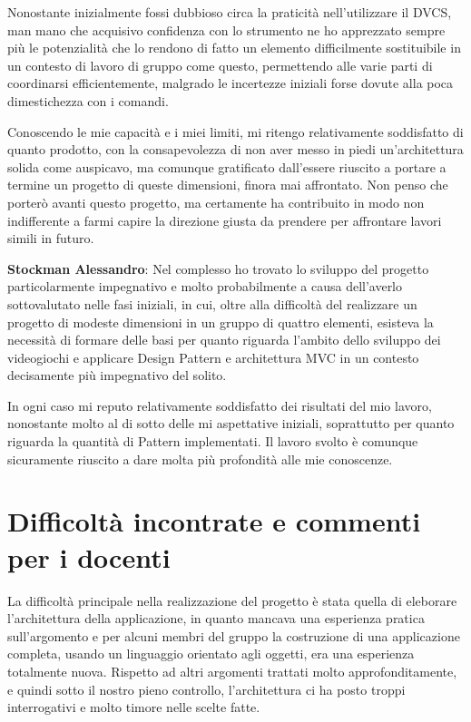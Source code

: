 \documentclass[a4paper,12pt, hidelinks]{report}
\begin{document}
Nonostante inizialmente fossi dubbioso circa la praticità nell'utilizzare il DVCS, man mano che acquisivo confidenza con lo strumento ne ho apprezzato sempre più le potenzialità che lo rendono di fatto un elemento difficilmente sostituibile in un contesto di lavoro di gruppo come questo, permettendo alle varie parti di coordinarsi efficientemente, malgrado le incertezze iniziali forse dovute alla poca dimestichezza con i comandi. 

Conoscendo le mie capacità e i miei limiti, mi ritengo relativamente soddisfatto di quanto prodotto, con la consapevolezza di non aver messo in piedi un'architettura solida come auspicavo, ma comunque gratificato dall'essere riuscito a portare a termine un progetto di queste dimensioni, finora mai affrontato. Non penso che porterò avanti questo progetto, ma certamente ha contribuito in modo non indifferente a farmi capire la direzione giusta da prendere per affrontare lavori simili in futuro.

	\item \textbf{Stockman Alessandro}: Nel complesso ho trovato lo sviluppo del progetto particolarmente impegnativo e molto probabilmente a causa dell'averlo sottovalutato nelle fasi iniziali, in cui, oltre alla difficoltà del realizzare un progetto di modeste dimensioni in un gruppo di quattro elementi, esisteva la necessità di formare delle basi per quanto riguarda l'ambito dello sviluppo dei videogiochi e applicare Design Pattern e architettura MVC in un contesto decisamente più impegnativo del solito.
	
In ogni caso mi reputo relativamente soddisfatto dei risultati del mio lavoro, nonostante molto al di sotto delle mi aspettative iniziali, soprattutto per quanto riguarda la quantità di Pattern implementati. Il lavoro svolto è comunque sicuramente riuscito a dare molta più profondità alle mie conoscenze.

\section{Difficoltà incontrate e commenti per i docenti}

La difficoltà principale nella realizzazione del progetto è stata quella di eleborare l'architettura della applicazione, in quanto mancava una esperienza pratica sull'argomento e per alcuni membri del gruppo la costruzione di una applicazione completa, usando un linguaggio orientato agli oggetti, era una esperienza totalmente nuova. Rispetto ad altri argomenti trattati molto approfonditamente, e quindi sotto il nostro pieno controllo, l'architettura ci ha posto troppi interrogativi e molto timore nelle scelte fatte.
\end{document}
